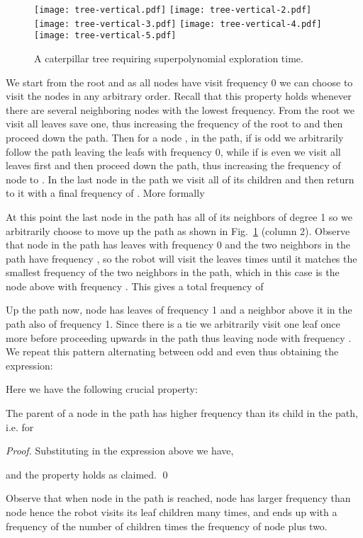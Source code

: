 \begin{figure}[h]
\vspace{-0.3cm}
\centering
\hspace{-0mm}\texttt{[image: tree-vertical.pdf]}\hspace{-2mm}
\texttt{[image: tree-vertical-2.pdf]}\hspace{-5mm}
\texttt{[image: tree-vertical-3.pdf]}\hspace{-1mm}
\texttt{[image: tree-vertical-4.pdf]}\hspace{-3.5mm}
\texttt{[image: tree-vertical-5.pdf]}
\caption{
\label{fig:caterpillar}
A caterpillar tree requiring superpolynomial exploration time.}
\end{figure}



We start from the root and as all nodes have visit frequency 0 we can choose to visit the nodes in any arbitrary
order. Recall that this property holds whenever there are several neighboring nodes
with the lowest frequency. From the root we visit all leaves save one, thus increasing the frequency of the root
to  and then proceed down the path. Then for a node ,  in the path, if  is odd
we arbitrarily follow the path leaving the leafs with frequency 0, while if  is even
we visit all leaves first and then proceed down the path, thus increasing the frequency of node  to .
In the last node in the path we visit all of its  children and then return to it with a final
frequency of . More formally

At this point the last node in the path has all of its neighbors of degree 1 so we
arbitrarily choose to move up the path as shown in Fig.~\ref{fig:caterpillar} (column 2). Observe that
node  in the path has  leaves with frequency 0 and the two neighbors in the
path have frequency , so the robot will visit the leaves  times until
it matches the smallest frequency of the two neighbors in the path, which in this
case is the node  above with frequency . This gives
a total frequency of

Up the path now, node  has  leaves of frequency 1 and a neighbor above it in the
path also of frequency 1. Since there is a tie we arbitrarily
visit one leaf once more
before proceeding upwards in the path thus leaving node  with frequency
. We repeat this pattern alternating between odd and even
thus obtaining the expression:

Here we have the following crucial property:
\begin{claim}
The parent of a node in the path has higher frequency than its child in the path, i.e.
 for 
\end{claim}
\begin{proof}
Substituting in the expression above we have,

and the property holds as claimed.
\qed
\end{proof}
Observe that when node  in the path is reached, node  has larger frequency than
node  hence the robot visits its leaf children  many times, and ends up with a
frequency of the number of children times the frequency of node  plus two.

